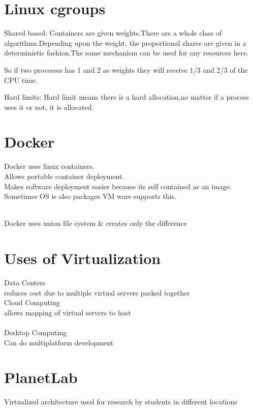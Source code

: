 \documentclass[twoside]{article}
\begin{document}
\section{Linux cgroups}

Shared based: Containers are given weights.There are a whole class of algorithms.Depending upon the weight, the proportional shares are given in a deterministic fashion.The same mechanism can be used for any resources here.

So if two processes has 
1 and 2 as weights they will receive 1/3 and 2/3 of the CPU time.

Hard limits: Hard limit means there is a hard allocation,no matter if a process uses it or not, it is allocated.

\section{Docker}

Docker uses linux containers. \\ Allows portable container deployment.\\Makes software deployment easier because its self contained as an image. Sometimes OS is also packages VM ware supports this.

\\Docker uses union file system & creates only the difference

\section{Uses of Virtualization}

Data Centers\\ reduces cost due to multiple virtual servers packed together \\

Cloud Computing\\
allows mapping of virtual servers to host
\\ \\
Desktop Computing\\
Can do multiplatform development

\section{PlanetLab}

Virtualized architecture used for research by students in different locations
\end{document}
